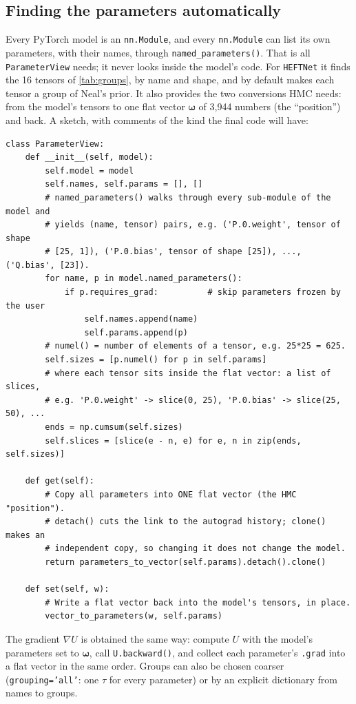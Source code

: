 \documentclass[11pt]{article}
\newcommand{\code}[1]{\texttt{#1}}
\newcommand{\bw}{\boldsymbol{\omega}}
\begin{document}
\subsection{Finding the parameters automatically}
\label{sec:view}

Every PyTorch model is an \code{nn.Module}, and every \code{nn.Module} can list its
own parameters, with their names, through \code{named\_parameters()}. That is all
\code{ParameterView} needs; it never looks inside the model's code. For
\code{HEFTNet} it finds the 16 tensors of \cref{tab:groups}, by name and shape,
and by default makes each tensor a group of Neal's prior. It also provides the two
conversions HMC needs: from the model's tensors to one flat vector $\bw$ of 3,944
numbers (the ``position'') and back. A sketch, with comments of the kind the
final code will have:

\begin{lstlisting}
class ParameterView:
    def __init__(self, model):
        self.model = model
        self.names, self.params = [], []
        # named_parameters() walks through every sub-module of the model and
        # yields (name, tensor) pairs, e.g. ('P.0.weight', tensor of shape
        # [25, 1]), ('P.0.bias', tensor of shape [25]), ..., ('Q.bias', [23]).
        for name, p in model.named_parameters():
            if p.requires_grad:          # skip parameters frozen by the user
                self.names.append(name)
                self.params.append(p)
        # numel() = number of elements of a tensor, e.g. 25*25 = 625.
        self.sizes = [p.numel() for p in self.params]
        # where each tensor sits inside the flat vector: a list of slices,
        # e.g. 'P.0.weight' -> slice(0, 25), 'P.0.bias' -> slice(25, 50), ...
        ends = np.cumsum(self.sizes)
        self.slices = [slice(e - n, e) for e, n in zip(ends, self.sizes)]

    def get(self):
        # Copy all parameters into ONE flat vector (the HMC "position").
        # detach() cuts the link to the autograd history; clone() makes an
        # independent copy, so changing it does not change the model.
        return parameters_to_vector(self.params).detach().clone()

    def set(self, w):
        # Write a flat vector back into the model's tensors, in place.
        vector_to_parameters(w, self.params)
\end{lstlisting}

\noindent The gradient $\nabla U$ is obtained the same way: compute $U$ with the
model's parameters set to $\bw$, call \code{U.backward()}, and collect each
parameter's \code{.grad} into a flat vector in the same order. Groups can also be
chosen coarser (\code{grouping='all'}: one $\tau$ for every parameter) or by an
explicit dictionary from names to groups.
\end{document}
